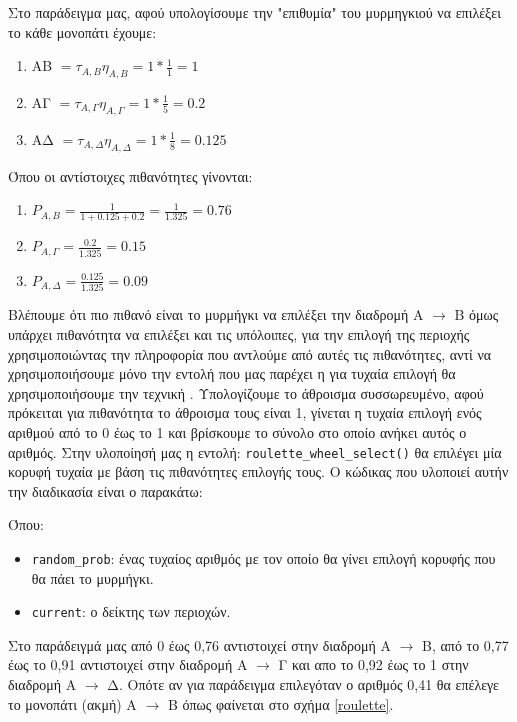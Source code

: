 Στο παράδειγμα μας, αφού υπολογίσουμε την "επιθυμία" του μυρμηγκιού να επιλέξει το κάθε μονοπάτι έχουμε:

\begin{enumerate}
    \item AΒ $= τ_{A,B}η_{A,B}=1*\frac{1}{1}=1$ 
    \item AΓ $= τ_{A,Γ}η_{A,Γ}=1*\frac{1}{5}=0.2$
    \item AΔ $= τ_{A,Δ}η_{A,Δ}=1*\frac{1}{8}=0.125$
\end{enumerate}

Όπου οι αντίστοιχες πιθανότητες γίνονται:

\begin{enumerate}
    \item $P_{A,B}=\frac{1}{1+0.125+0.2}=\frac{1}{1.325}=0.76$
    \item $P_{A,Γ}=\frac{0.2}{1.325}=0.15$
    \item $P_{A,Δ}=\frac{0.125}{1.325}=0.09$
\end{enumerate}

Βλέπουμε ότι πιο πιθανό είναι το μυρμήγκι να επιλέξει την διαδρομή Α $\rightarrow$ Β όμως υπάρχει πιθανότητα να επιλέξει και τις υπόλοιπες, για την επιλογή της περιοχής χρησιμοποιώντας την πληροφορία που αντλούμε από αυτές τις πιθανότητες, αντί να χρησιμοποιήσουμε μόνο την εντολή  που μας παρέχει η  για τυχαία επιλογή θα χρησιμοποιήσουμε την τεχνική  \cite{lipowski2012roulette}. Υπολογίζουμε το άθροισμα συσσωρευμένο, αφού πρόκειται για πιθανότητα το άθροισμα τους είναι 1, γίνεται η τυχαία επιλογή ενός αριθμού από το 0 έως το 1 και βρίσκουμε το σύνολο στο οποίο ανήκει αυτός ο αριθμός.
Στην υλοποίησή μας η εντολή: \verb|roulette_wheel_select()| θα επιλέγει μία κορυφή τυχαία με βάση τις πιθανότητες επιλογής τους. Ο κώδικας που υλοποιεί αυτήν την διαδικασία είναι ο παρακάτω: 

Όπου:
\begin{itemize}
    \item \verb|random_prob|: ένας τυχαίος αριθμός με τον οποίο θα γίνει επιλογή κορυφής που θα πάει το μυρμήγκι.
    \item \verb|current|: ο δείκτης των περιοχών.
\end{itemize}

Στο παράδειγμά μας από 0 έως 0,76 αντιστοιχεί στην διαδρομή Α $\rightarrow$ Β, από το 0,77 έως το 0,91 αντιστοιχεί στην διαδρομή Α $\rightarrow$ Γ και απο το 0,92 έως το 1 στην διαδρομή Α $\rightarrow$ Δ. Οπότε αν για παράδειγμα επιλεγόταν ο αριθμός 0,41 θα επέλεγε το μονοπάτι (ακμή) Α $\rightarrow$ Β όπως φαίνεται στο σχήμα \ref{roulette}.
 
